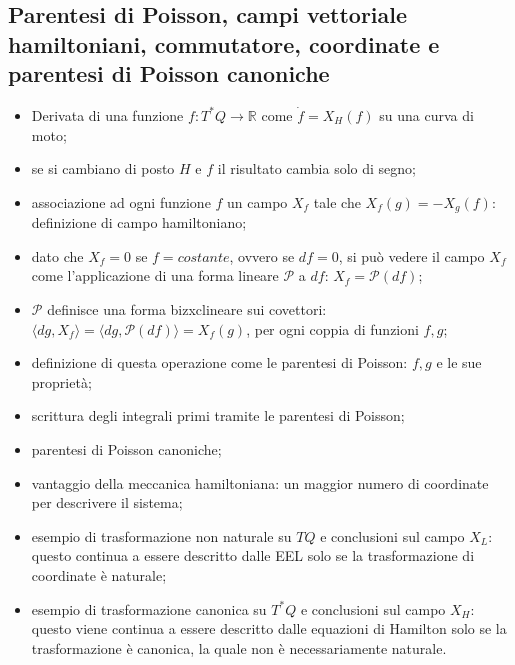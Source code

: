 \documentclass{article}
\theoremstyle{remark}
\begin{document}
\subsection{Parentesi di Poisson, campi vettoriale hamiltoniani, commutatore, coordinate e parentesi di Poisson canoniche}
\begin{itemize}
    \item Derivata di una funzione $f:T^*Q\to\mathbb{R}$ come $\dot{f}=X_H(f)$ su una curva di moto;
    \item se si cambiano di posto $H$ e $f$ il risultato cambia solo di segno;
    \item associazione ad ogni funzione $f$ un campo $X_f$ tale che $X_f(g)=-X_g(f)$: definizione di campo hamiltoniano;
    \item dato che $X_f=0$ se $f=costante$, ovvero se $df=0$, si può vedere il campo $X_f$ come l'applicazione di una forma lineare $\mathcal{P}$ a $df$: $X_f=\mathcal{P}(df)$;
    \item $\mathcal{P}$ definisce una forma bizxclineare sui covettori: $\langle dg,X_f\rangle=\langle dg,\mathcal{P}(df)\rangle=X_f(g)$, per ogni coppia di funzioni $f,g$;
    \item definizione di questa operazione come le parentesi di Poisson: ${f,g}$ e le sue proprietà;
    \item scrittura degli integrali primi tramite le parentesi di Poisson;
    \item parentesi di Poisson canoniche;
    \item vantaggio della meccanica hamiltoniana: un maggior numero di coordinate per descrivere il sistema;
    \item esempio di trasformazione non naturale su $TQ$ e conclusioni sul campo $X_L$: questo continua a essere descritto dalle EEL solo se la trasformazione di coordinate è naturale;
    \item esempio di trasformazione canonica su $T^*Q$ e conclusioni sul campo $X_H$: questo viene continua a essere descritto dalle equazioni di Hamilton solo se la trasformazione è canonica, la quale non è necessariamente naturale. 
\end{itemize}
\end{document}
